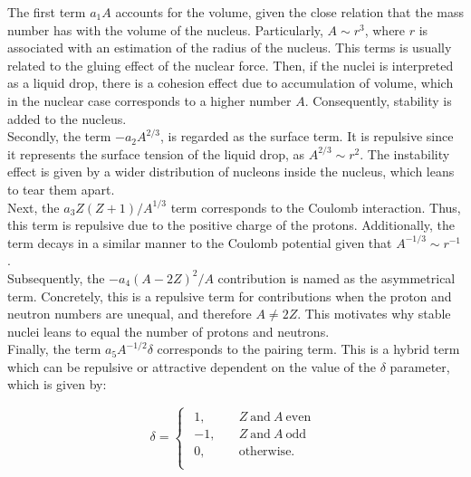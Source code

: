 \documentclass[openany]{book}
\begin{document}
The first term $a_1A$ accounts for the volume, given the close relation that the mass number has with the volume of the nucleus. Particularly, $A \sim r^3$, where $r$ is associated with an estimation of the radius of the nucleus. This terms is usually related to the gluing effect of the nuclear force. Then, if the nuclei is interpreted as a liquid drop, there is a cohesion effect due to accumulation of volume, which in the nuclear case corresponds to a higher number $A$. Consequently, stability is added to the nucleus.   \\

Secondly, the term $- a_2A^{2/3} $, is regarded as the surface term. It is repulsive since it represents the surface tension of the liquid drop, as $A^{2/3}  \sim r^2$. The instability effect is given by a wider distribution of nucleons inside the nucleus, which leans to tear them apart. \\

Next, the $ a_3 Z(Z+1)/A^{1/3}$ term corresponds to the Coulomb interaction. Thus, this term is repulsive due to the positive charge of the protons. Additionally, the term decays in a similar manner to the Coulomb potential given that $A^{-1/3} \sim r^{-1}$. \\

Subsequently, the $ -a_4 (A - 2Z)^2/A$ contribution is named as the asymmetrical term. Concretely, this is a repulsive term for contributions when the proton and neutron numbers are unequal, and therefore $A \neq 2Z$. This motivates why stable nuclei leans to equal the number of protons and neutrons.\\ 

Finally, the term $a_5 A^{-1/2} \delta$ corresponds to the pairing term. This is a hybrid term which can be repulsive or attractive dependent on the value of the $\delta$ parameter, which is given by:

\begin{equation} \label{eq:liquidDrop_deltaFactor}
	\delta = 	\left\{\begin{array}{l}
		\begin{split}
			1, \quad & Z \ \mathrm{and} \ A \  \mathrm{even} \\ 
			-1, \quad &  Z \ \mathrm{and} \ A \  \mathrm{odd} 	\\
			0, \quad & \mathrm{otherwise}.	\\
		\end{split}
	\end{array}\right.
\end{equation}
\end{document}
